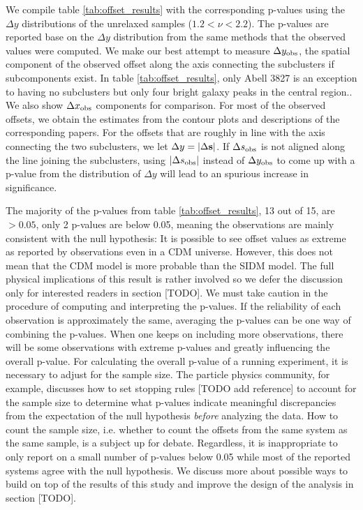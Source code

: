We compile table \ref{tab:offset_results} with the corresponding p-values using
the $\Delta y$ distributions of the unrelaxed samples ($1.2 < \nu < 2.2$). 
The p-values are reported base on the $\Delta y$ distribution from the same methods
that the observed values were computed. 
We make our best attempt to measure $\Delta y_{\rm obs}$, the spatial component of the
observed offset along the axis connecting the subclusters if subcomponents exist. 
In table \ref{tab:offset_results}, only Abell 3827 is an exception to having no
subclusters but only four bright galaxy peaks in the central region.. 
We also show $\Delta x_{\rm obs}$ components for comparison.
For most of the observed offsets, we obtain the estimates from the contour plots 
and descriptions of the corresponding papers. 
For the offsets that are roughly in line with the axis connecting the two subclusters,
we let $\Delta y = |\Delta {\bf s}|$. 
If $\Delta s_{\rm obs}$ is not aligned along the line joining the subclusters,
using $|\Delta s_{\rm obs}|$ instead of $\Delta y_{\rm obs}$ to come 
up with a p-value from the distribution of 
$\Delta y$ will lead to an spurious increase in significance.

The majority of the p-values from table \ref{tab:offset_results}, 13 out of 15, are
$ > 0.05$, only 2 p-values are below 0.05,  
meaning the observations are mainly consistent with the null hypothesis: 
It is possible to see offset values as extreme as reported by observations even
in a CDM universe. 
However, this does not mean that the CDM model is more probable than the SIDM model. 
The full physical implications of this result is rather involved so we defer
the discussion only for interested readers in section [TODO].
We must take caution in the procedure of computing and interpreting the p-values. 
If the reliability of each observation is 
approximately the same, averaging the p-values can be one way of combining the p-values.
When one keeps on including more observations,  
there will be some observations with extreme p-values and greatly influencing the
overall p-value.
For calculating the overall p-value of a running experiment, 
it is necessary to adjust for the sample size.   
The particle physics community,
for example, discusses how to set stopping rules [TODO add reference]
to account for the sample size to determine what p-values indicate meaningful
discrepancies from the expectation of the null hypothesis {\it before}
analyzing the data. 
How to count the sample size, i.e. whether to count the offsets from the same
system as the same sample, is a subject up for debate.
Regardless, it is inappropriate to only report on 
a small number of p-values below 0.05 while most of the reported systems agree with 
the null hypothesis. We discuss more about possible ways to build on top of the results
of this study and improve the design of the 
analysis in section [TODO]. 

